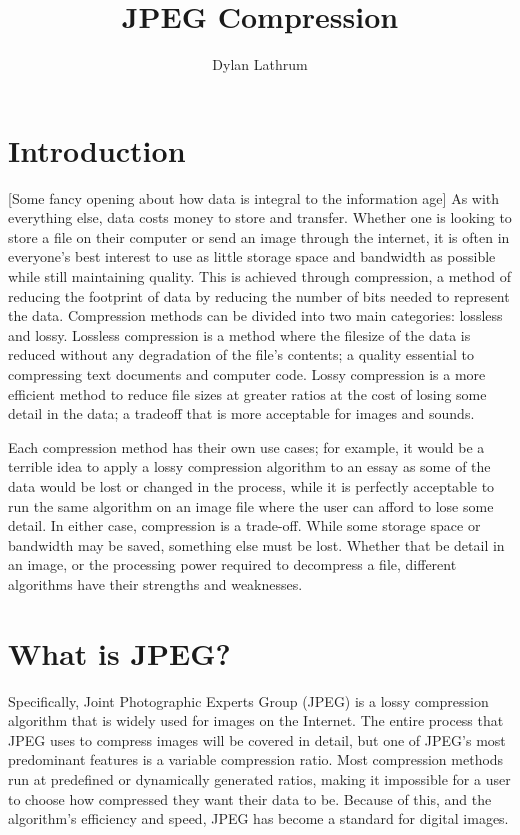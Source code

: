 \documentclass[11pt]{article}
\title{\vspace{-1.0cm}JPEG Compression}
\author{Dylan Lathrum}
\begin{document}
\maketitle

\section{Introduction}

[Some fancy opening about how data is integral to the information age]
As with everything else, data costs money to store and transfer.
Whether one is looking to store a file on their computer or send an image through the internet, it is often in everyone’s best interest to use as little storage space and bandwidth as possible while still maintaining quality.
This is achieved through compression, a method of reducing the footprint of data by reducing the number of bits needed to represent the data.
Compression methods can be divided into two main categories: lossless and lossy.
Lossless compression is a method where the filesize of the data is reduced without any degradation of the file’s contents; a quality essential to compressing text documents and computer code.
Lossy compression is a more efficient method to reduce file sizes at greater ratios at the cost of losing some detail in the data; a tradeoff that is more acceptable for images and sounds.

Each compression method has their own use cases; for example, it would be a terrible idea to apply a lossy compression algorithm to an essay as some of the data would be lost or changed in the process, while it is perfectly acceptable to run the same algorithm on an image file where the user can afford to lose some detail.
In either case, compression is a trade-off. While some storage space or bandwidth may be saved, something else must be lost.
Whether that be detail in an image, or the processing power required to decompress a file, different algorithms have their strengths and weaknesses.


\section{What is JPEG?}
\label{sec: whatisjpeg}

Specifically, Joint Photographic Experts Group (JPEG) is a lossy compression algorithm that is widely used for images on the Internet.
The entire process that JPEG uses to compress images will be covered in detail, but one of JPEG’s most predominant features is a variable compression ratio.
Most compression methods run at predefined or dynamically generated ratios, making it impossible for a user to choose how compressed they want their data to be.
Because of this, and the algorithm’s efficiency and speed, JPEG has become a standard for digital images.
\end{document}
